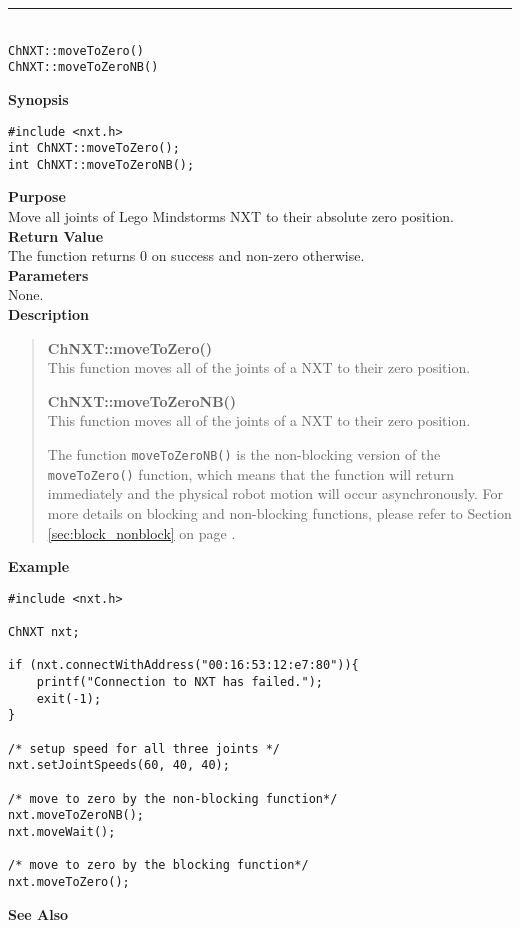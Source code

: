 \noindent
\vspace{5pt}
\rule{4.5in}{0.015in}\\
\noindent
{\LARGE \texttt{ChNXT::moveToZero()} }\\
{\LARGE \texttt{ChNXT::moveToZeroNB()} }\\


\noindent
{\bf Synopsis}
\begin{lstlisting}
#include <nxt.h>
int ChNXT::moveToZero();
int ChNXT::moveToZeroNB();
\end{lstlisting}

\noindent
{\bf Purpose}\\
Move all joints of Lego Mindstorms NXT to their absolute zero position. \\

\noindent
{\bf Return Value}\\
The function returns 0 on success and non-zero otherwise.\\

\noindent
{\bf Parameters}\\
None.\\

\noindent
{\bf Description}\\
\vspace{-12pt}
\begin{quote}
{\bf ChNXT::moveToZero()}\\
This function moves all of the joints of a NXT to their zero 
position.

{\bf ChNXT::moveToZeroNB()}\\
This function moves all of the joints of a NXT to their zero 
position.

The function \texttt{moveToZeroNB()} is the non-blocking version 
of the \texttt{moveToZero()} function, which means that the 
function will return immediately and the physical robot motion 
will occur asynchronously. For more details on blocking and 
non-blocking functions, please refer to Section \ref{sec:block_nonblock}
on page \pageref{sec:block_nonblock}.\\
\end{quote}

\noindent
{\bf Example}
\begin{lstlisting}
#include <nxt.h> 

ChNXT nxt;

if (nxt.connectWithAddress("00:16:53:12:e7:80")){
    printf("Connection to NXT has failed.");
    exit(-1);
}
 
/* setup speed for all three joints */
nxt.setJointSpeeds(60, 40, 40);

/* move to zero by the non-blocking function*/
nxt.moveToZeroNB();
nxt.moveWait();

/* move to zero by the blocking function*/
nxt.moveToZero();
\end{lstlisting}

\noindent
{\bf See Also}\\

